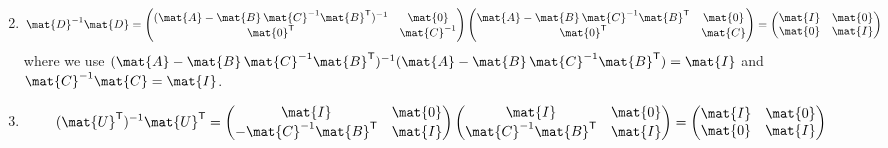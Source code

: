 \documentclass{sotonExamBoxes}    %
\newcommand{\tr}{\textsf{T}}
\begin{document}
\begin{question}{25}
\begin{qparts}
\begin{answer}
\begin{enumerate}
\begin{align*}
        \end{align*}
      \item
        \begin{align*}
          \mat{D}^{-1}\mat{D} =  \begin{pmatrix} (\mat{A}-
           \mat{B}\,\mat{C}^{-1}\mat{B}^{\tr})^{-1} & \mat{0}\\
           \mat{0}^{\tr} & \mat{C}^{-1} \end{pmatrix} \begin{pmatrix} \mat{A}-
           \mat{B}\,\mat{C}^{-1}\mat{B}^{\tr}
           & \mat{0}\\ \mat{0}^{\tr} &
           \mat{C}  \end{pmatrix}= \begin{pmatrix} \mat{I} & \mat{0}
           \\ \mat{0} &  \mat{I} \end{pmatrix}                                                                                   
        \end{align*}
        where we use $(\mat{A}-
           \mat{B}\,\mat{C}^{-1}\mat{B}^{\tr})^{-1}(\mat{A}-
           \mat{B}\,\mat{C}^{-1}\mat{B}^{\tr}) = \mat{I}$ and
           $\mat{C}^{-1}\mat{C}=\mat{I}$.
         \item
           \begin{align*}
              (\mat{U}^\tr)^{-1}\mat{U}^\tr =
           \begin{pmatrix} \mat{I} &
        \mat{0} \\ -\mat{C}^{-1} \mat{B}^\tr & \mat{I} \end{pmatrix} 
         \begin{pmatrix} \mat{I} & \mat{0}\\ 
           \mat{C}^{-1}\mat{B}^{\tr} & \mat{I} \end{pmatrix}
                                       =          \begin{pmatrix} \mat{I} & \mat{0}
           \\ \mat{0} &  \mat{I} \end{pmatrix}                                             
           \end{align*}
         \end{enumerate}
       \end{answer}
       \clearpage
       

\end{qparts}
\end{question}
\end{document}

